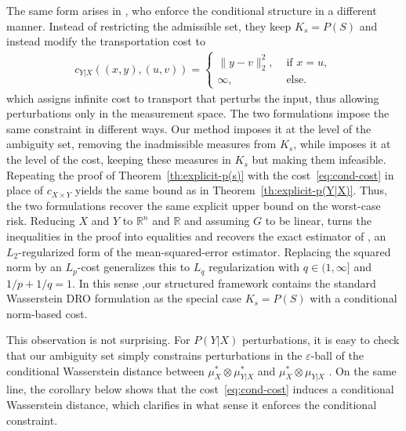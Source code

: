 \documentclass{article}
\newcommand{\R}{\mathbb{R}} %
\theoremstyle{definition}
\theoremstyle{remarksty}
\begin{document}
The same form arises in \cite{blanchet_robust_2019}, who enforce the conditional structure in a different manner. Instead of restricting the admissible set, they keep $K_s=P(S)$ and instead modify the transportation cost to
\begin{align}\label{eq:cond-cost}
    c_{Y|X}((x,y), (u,v)) = \begin{cases}
        \|y - v\|^2_2, &\text{ if } x=u,  \\
        \infty, &\text{ else.}
    \end{cases}
\end{align}
which assigns infinite cost to transport that perturbs the input, thus allowing perturbations only in the measurement space. The two formulations impose the same constraint in different ways. Our method imposes it at the level of the ambiguity set, removing the inadmissible measures from $K_s$, while \cite{blanchet_robust_2019} imposes it at the level of the cost, keeping these measures in $K_s$ but making them infeasible. Repeating the proof of Theorem~\ref{th:explicit-p(s)} with the cost~\eqref{eq:cond-cost} in place of $c_{X\times Y}$ yields the same bound as in Theorem~\ref{th:explicit-p(Y|X)}. Thus, the two formulations recover the same explicit upper bound on the worst-case risk. Reducing $X$ and $Y$ to $\R^n$ and $\R$ and assuming $G$ to be linear, turns the inequalities in the proof into equalities and recovers the exact estimator of \cite{blanchet_robust_2019}, an $L_2$-regularized form of the mean-squared-error estimator. Replacing the squared norm by an $L_p$-cost generalizes this to $L_q$ regularization with $q\in(1,\infty]$ and $1/p+1/q=1$. In this sense ,our structured framework contains the standard Wasserstein DRO formulation as the special case $K_s=P(S)$ with a conditional norm-based cost.

This observation is not surprising. For $P(Y|X)$ perturbations, it is easy to check that our ambiguity set simply constrains perturbations in the $\varepsilon$-ball of the conditional Wasserstein distance between $\mu_X^* \otimes \mu^*_{Y|X}$ and $\mu_X^* \otimes \mu_{Y|X}$ \cite{chemseddine_conditional_2025}. On the same line, the corollary below shows that the cost~\eqref{eq:cond-cost} induces a conditional Wasserstein distance, which clarifies in what sense it enforces the conditional constraint.
\end{document}
